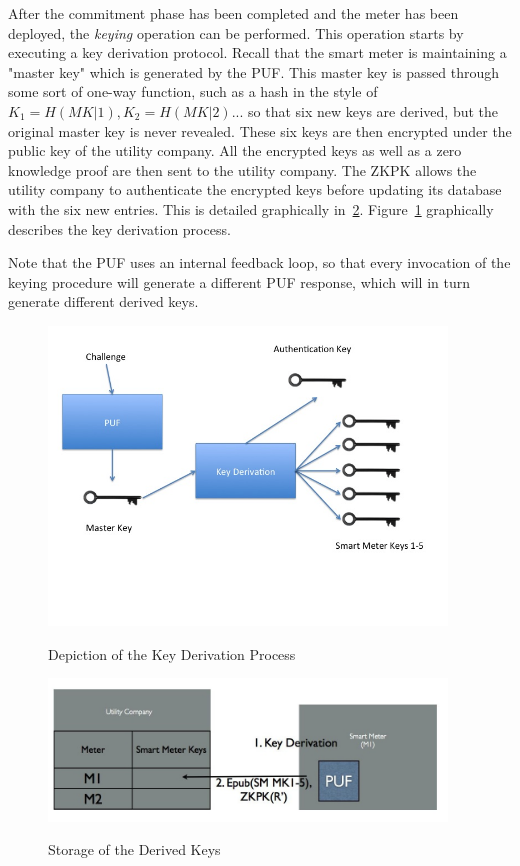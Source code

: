 After the commitment phase has been completed and the meter has been deployed, the \textit{keying} operation
can be performed. This operation starts by executing a key derivation protocol. Recall that the smart meter is 
maintaining a "master key" which is generated by the PUF. 
This master key is passed through some sort of one-way function, such as a hash
in the style of $K_1=H(MK|1), K_2=H(MK|2)...$ so that six new keys are derived, but the original master key is
never revealed. These six keys are then
encrypted under the public key of the utility company. All the encrypted keys as well as a zero knowledge proof
are then sent to the utility company. The ZKPK allows the utility company to authenticate the encrypted keys before
updating its database with the six new entries. This is detailed graphically in~\ref{fig:doeusage}.
Figure~\ref{fig:keyderivation} graphically describes the key derivation process.

Note that the PUF uses an internal feedback loop, so that every invocation of the keying procedure will generate a
different PUF response, which will in turn generate different derived keys.

\begin{figure}[!ht]
\includegraphics[width=400px]{images/keyderivation.jpg}
\label{fig:keyderivation}
\caption{Depiction of the Key Derivation Process}
\end{figure}
\FloatBarrier

\begin{figure}[!ht]
\includegraphics[width=400px]{images/doe_key_config.jpg}
\label{fig:doeusage}
\caption{Storage of the Derived Keys}
\end{figure}
\FloatBarrier


